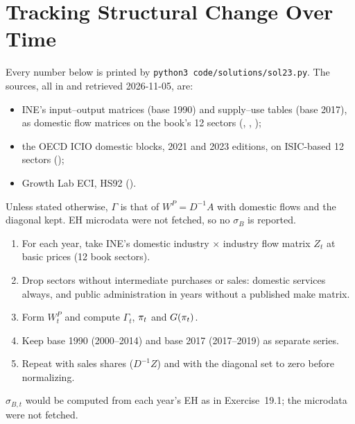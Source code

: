 \documentclass[../solutions_manual.tex]{subfiles}
\begin{document}
\ifSubfilesClassLoaded{\setcounter{chapter}{22}}{}%
\setcounter{chapter}{22}%
\chapter{Tracking Structural Change Over Time}\label{sol23}

Every number below is printed by \texttt{python3 code/solutions/sol23.py}. The sources, all in  and retrieved 2026-11-05, are:
\begin{itemize}
\item INE's input--output matrices (base 1990) and supply--use tables (base 2017), as domestic flow matrices on the book's 12 sectors (, , );
\item the OECD ICIO domestic blocks, 2021 and 2023 editions, on ISIC-based 12 sectors ();
\item Growth Lab ECI, HS92 ().
\end{itemize}
Unless stated otherwise, $\Gamma$ is that of $W^P = D^{-1}A$ with domestic flows and the diagonal kept. EH microdata were not fetched, so no $\sigma_B$ is reported.


\begin{enumerate}
\item For each year, take INE's domestic industry $\times$ industry flow matrix $Z_t$ at basic prices (12 book sectors).
\item Drop sectors without intermediate purchases or sales: domestic services always, and public administration in years without a published make matrix.
\item Form $W^P_t$ and compute $\Gamma_t$, $\pi_t$ and $G(\pi_t)$.
\item Keep base 1990 (2000--2014) and base 2017 (2017--2019) as separate series.
\item Repeat with sales shares ($D^{-1}Z$) and with the diagonal set to zero before normalizing.
\end{enumerate}
$\sigma_{B,t}$ would be computed from each year's EH as in Exercise~19.1; the microdata were not fetched.
\end{document}
